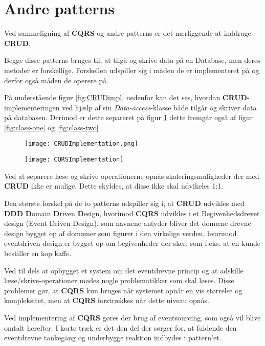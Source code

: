 \section{Andre patterns}
Ved sammeligning af \textbf{CQRS} og andre patterns er det nærliggende at inddrage \textbf{CRUD}.

Begge disse patterns bruges til, at tilgå og skrive data på en Database, men deres metoder er forskellige. Forskellen udspiller sig i måden de er implementeret på og derfor også måden de operere på.\newline

På understående figur \ref{fig:CRUDimpl} nedenfor kan det ses, hvordan \textbf{CRUD}-implementeringen ved hjælp af sin \textit{Data-access}-klasse både tilgår og skriver data på databasen. Derimod er dette separeret på figur \ref{fig:CQRSimpl} dette fremgår også af figur \ref{fig:class-one} og \ref{fig:class-two}

\begin{figure}[H]
	\centering
	\begin{minipage}{.5\textwidth}
		\centering
		\texttt{[image: CRUDImplementation.png]}
		\label{fig:CRUDimpl}
	\end{minipage}%
	\begin{minipage}{.5\textwidth}
		\centering
		\texttt{[image: CQRSImplementation]}
		\label{fig:CQRSimpl}
	\end{minipage}
\end{figure}


Ved at separere læse og skrive operationerne opnås skaleringsmuligheder der med \textbf{CRUD} ikke er mulige. Dette skyldes, at disse ikke skal udvikeles 1:1.\newline

Den største forskel på de to patterns udspiller sig i, at \textbf{CRUD} udvikles med \textbf{DDD} \textbf{D}omain \textbf{D}riven \textbf{D}esign, hvorimod \textbf{CQRS} udvikles i et Begivenhedsdrevet design (Event Driven Design). som navnene antyder bliver det domæne drevne design bygget op af domæner som figurer i den virkelige verden, hvorimod eventdriven design er bygget op om begivenheder der sker. som f.eks. at en kunde bestiller en kop kaffe.

Ved til dels at opbygget et system om det eventdrevne princip og at adskille læse/skrive-operationer mødes nogle problematikker som skal løses. Disse problemer gør, at \textbf{CQRS} kun bruges når systemet opnår en vis størrelse og kompleksitet, men at \textbf{CQRS} forstrækkes når dette niveau opnås.\newline

Ved implementering af \textbf{CQRS} gøres der brug af eventsourcing, som også vil blive omtalt herefter. I korte træk er det den del der sørger for, at fuldende den eventdrevne tankegang og underbygge reaktion indbydes i pattern'et.


